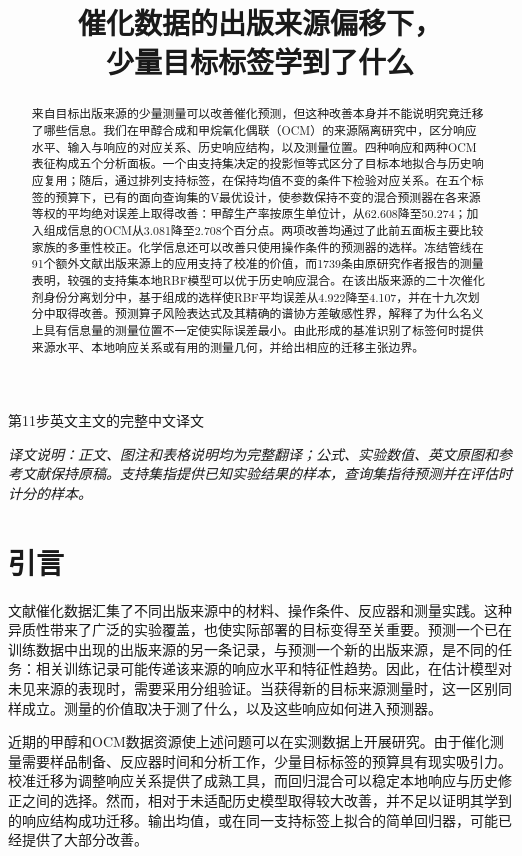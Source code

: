 \documentclass[11pt]{article}
\title{催化数据的出版来源偏移下，\\少量目标标签学到了什么}
\author{}\date{}
\begin{document}
\maketitle
\begin{center}\small 第11步英文主文的完整中文译文\end{center}
\begin{abstract}
来自目标出版来源的少量测量可以改善催化预测，但这种改善本身并不能说明究竟迁移了哪些信息。我们在甲醇合成和甲烷氧化偶联（OCM）的来源隔离研究中，区分响应水平、输入与响应的对应关系、历史响应结构，以及测量位置。四种响应和两种OCM表征构成五个分析面板。一个由支持集决定的投影恒等式区分了目标本地拟合与历史响应复用；随后，通过排列支持标签，在保持均值不变的条件下检验对应关系。在五个标签的预算下，已有的面向查询集的V最优设计，使参数保持不变的混合预测器在各来源等权的平均绝对误差上取得改善：甲醇生产率按原生单位计，从62.608降至50.274；加入组成信息的OCM从3.081降至2.708个百分点。两项改善均通过了此前五面板主要比较家族的多重性校正。化学信息还可以改善只使用操作条件的预测器的选样。冻结管线在91个额外文献出版来源上的应用支持了校准的价值，而1739条由原研究作者报告的测量表明，较强的支持集本地RBF模型可以优于历史响应混合。在该出版来源的二十次催化剂身份分离划分中，基于组成的选样使RBF平均误差从4.922降至4.107，并在十九次划分中取得改善。预测算子风险表达式及其精确的谱协方差敏感性界，解释了为什么名义上具有信息量的测量位置不一定使实际误差最小。由此形成的基准识别了标签何时提供来源水平、本地响应关系或有用的测量几何，并给出相应的迁移主张边界。
\end{abstract}

\noindent\textit{译文说明：正文、图注和表格说明均为完整翻译；公式、实验数值、英文原图和参考文献保持原稿。支持集指提供已知实验结果的样本，查询集指待预测并在评估时计分的样本。}

\section{引言}
文献催化数据汇集了不同出版来源中的材料、操作条件、反应器和测量实践。这种异质性带来了广泛的实验覆盖，也使实际部署的目标变得至关重要。预测一个已在训练数据中出现的出版来源的另一条记录，与预测一个新的出版来源，是不同的任务：相关训练记录可能传递该来源的响应水平和特征性趋势。因此，在估计模型对未见来源的表现时，需要采用分组验证\cite{roberts}。当获得新的目标来源测量时，这一区别同样成立。测量的价值取决于测了什么，以及这些响应如何进入预测器。

近期的甲醇和OCM数据资源使上述问题可以在实测数据上开展研究\cite{toldy,yan,suvarna,schmack,mine}。由于催化测量需要样品制备、反应器时间和分析工作，少量目标标签的预算具有现实吸引力。校准迁移为调整响应关系提供了成熟工具\cite{feudale}，而回归混合可以稳定本地响应与历史修正之间的选择\cite{breiman,efron}。然而，相对于未适配历史模型取得较大改善，并不足以证明其学到的响应结构成功迁移。输出均值，或在同一支持标签上拟合的简单回归器，可能已经提供了大部分改善。
\end{document}
